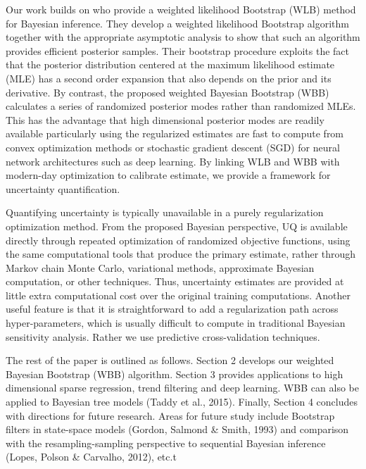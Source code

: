 \documentclass[12pt]{TD-CJS}
\begin{document}
Our work builds on \cite{newton1994approximate} who provide a weighted likelihood Bootstrap (WLB) method for Bayesian inference. They develop a weighted likelihood Bootstrap algorithm together with the appropriate asymptotic analysis to show that such an algorithm 
provides efficient posterior samples. Their bootstrap procedure exploits the fact that the posterior distribution centered at the maximum likelihood estimate (MLE) has a second order expansion that also depends on the prior
and its derivative. By contrast, the proposed weighted Bayesian Bootstrap (WBB) calculates a series of
randomized  posterior modes rather than randomized MLEs. This has the advantage that high dimensional posterior modes are readily available particularly using the regularized estimates are fast to compute from convex optimization methods or stochastic gradient descent (SGD) for neural network architectures such as deep learning. By linking WLB and WBB with modern-day optimization to calibrate estimate, we provide a framework for uncertainty quantification.

Quantifying uncertainty is typically unavailable in a purely regularization optimization method. 
From the proposed Bayesian perspective, UQ is 
available directly through repeated optimization of randomized objective functions, using the same
computational tools that produce the primary estimate,  rather through Markov
chain Monte Carlo, variational methods,  approximate Bayesian computation, or other techniques. 
Thus, uncertainty estimates are provided at little extra computational cost over the original
training computations.  Another useful feature is that  it is straightforward to add a regularization path across hyper-parameters, which is usually difficult to compute in traditional Bayesian
sensitivity analysis.  Rather we use predictive cross-validation techniques.

The rest of the paper is outlined as follows. Section 2 develops our weighted Bayesian Bootstrap (WBB) algorithm. Section 3 provides applications to high dimensional sparse regression, trend filtering and deep learning. WBB can also be applied to Bayesian tree models (Taddy et al., 2015). Finally, Section 4 concludes with directions for future research. Areas for future study include Bootstrap filters in state-space models (Gordon{,}  Salmond \& Smith, 1993)  and comparison with the resampling-sampling
perspective to sequential Bayesian inference (Lopes, Polson \& Carvalho, 2012), etc.t
\end{document}
